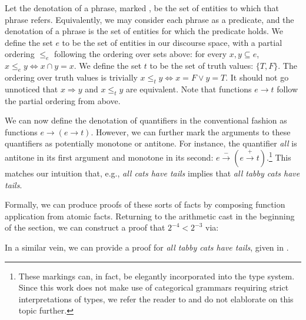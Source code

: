 Let the denotation of a phrase, marked \denote{\cdot}, be the set of
  entities to which that phrase refers.
Equivalently, we may consider each phrase as a predicate, and the denotation
  of a phrase is the set of entities for which the predicate holds.
We define the set $e$ to be the set of entities in our discourse space,
  with a partial ordering $\le_e$ following the ordering over sets
  above: for every $x,y \subseteq e$, $x \le_e y \Leftrightarrow x \cap y = x$.
We define the set $t$ to be the set of truth values: $\{T, F\}$.
The ordering over truth values is trivially
  $x \le_t y \Leftrightarrow x = F \lor y = T$.
It should not go unnoticed that $x \Rightarrow y$ and $x \le_t y$ 
  are equivalent.
Note that functions $e \rightarrow t$ follow the partial ordering from
  above.

We can now define the denotation of quantifiers in the conventional
  fashion as functions $e \rightarrow (e \rightarrow t)$.
However, we can further mark the arguments to these quantifiers as
  potentially monotone or antitone.
For instance, the quantifier \textit{all} is antitone in its first
  argument and monotone in its second:
  $e \xrightarrow{-} (e \xrightarrow{+} t)$.\footnote{
    These markings can, in fact, be elegantly incorporated into the
    type system. Since this work does not make use of categorical
    grammars requiring strict interpretations of types, we refer the
    reader to  and do not elablorate
    on this topic further.
  }
This matches our intuition that, e.g., \textit{all cats have tails}
  implies that \textit{all tabby cats have tails}.

Formally, we can produce proofs of these sorts of facts by composing
  function application from atomic facts.
Returning to the arithmetic cast in the beginning of the section, we
  can construct a proof that $2^{-4} < 2^{-3}$ via:

\begin{prooftree}
\end{prooftree}

In a similar vein, we can provide a proof for \textit{all tabby cats
  have tails}, given in .

